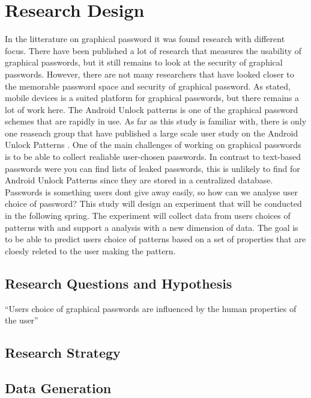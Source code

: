 \chapter{Research Design}
  
  In the litterature on graphical password it was found research with different focus. There have been published a lot of research that measures the usability of graphical passwords, but it still remains to look at the security of graphical passwords. However, there are not many researchers that have looked closer to the memorable password space and security of graphical password. As stated, mobile devices is a suited platform for graphical passwords, but there remains a lot of work here. The Android Unlock patterns is one of the graphical password schemes that are rapidly in use. As far as this study is familiar with, there is only one reaseach group that have published a large scale user study on the Android Unlock Patterns \cite{Ullenbeck}. One of the main challenges of working on graphical passwords is to be able to collect realiable user-chosen passwords. In contrast to text-based passwords were you can find lists of leaked passwords, this is unlikely to find for Android Unlock Patterns since they are stored in a centralized database. Passwords is something users dont give away easily, so how can we analyse user choice of password?  This study will design an experiment that will be conducted in the following spring. The experiment will collect data from users choices of patterns with and support a analysis with a new dimension of data. The goal is to be able to predict users choice of patterns based on a set of properties that are cloesly releted to the user making the pattern. 

  \section{Research Questions and Hypothesis}

    ``Users choice of graphical passwords are influenced by the human properties of the user''


  \section{Research Strategy}


  \section{Data Generation}
    
